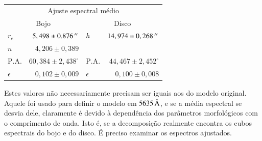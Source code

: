 \begin{tabular}{ l  r | l  r }
  \hline
  \multicolumn{4}{c}{Ajuste espectral médio} \\
  \multicolumn{2}{c}{Bojo} & \multicolumn{2}{c}{Disco} \\
  \hline
  $r_e$ & $5,498 \pm 0.876\,^{\prime\prime}$ & $h$ & $14,974 \pm 0,268\,^{\prime\prime}$ \\
  $n$ & $4,206 \pm 0,389$ & & \\
  $\mathrm{P.A.}$ & $60,384 \pm 2,438^\circ$ & $\mathrm{P.A.}$ & $44,467 \pm
  2,452^\circ$ \\
  $\epsilon$ & $0,102 \pm 0,009$ & $\epsilon$ & $0,100 \pm 0,008$ \\
  \hline
\end{tabular}

Estes valores não necessariamente precisam ser iguais aos do modelo original.
Aquele foi usado para definir o modelo em $5635\,\text{\normalfont\AA}$, e se a média
espectral se desvia dele, claramente é devido à dependência dos parâmetros
morfológicos com o comprimento de onda. Isto é, se a decomposição realmente
encontra os cubos espectrais do bojo e do disco. É preciso examinar os espectros
ajustados.

